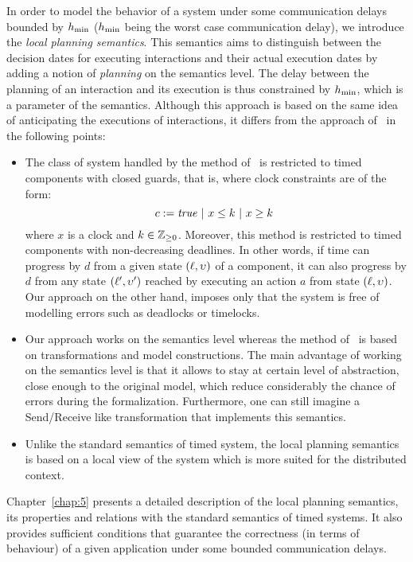 In order to model the behavior of a system under some communication delays bounded by $h_{\min}$
($h_{\min}$ being the worst case communication delay), we introduce the \emph{local planning 
semantics}. This semantics aims to distinguish between the decision dates for executing 
interactions and their actual execution dates by adding a notion of \emph{planning} on 
the semantics level. The delay between the planning of an interaction and its execution is
thus constrained by $h_{\min}$, which is a parameter of the semantics. Although this approach 
is based on the same idea of anticipating the executions of interactions, it differs from 
the approach of~\cite{ahlem_these} in the following points:
\begin{itemize}
  \item The class of system handled by the method of~\cite{ahlem_these} is restricted to 
    timed components with closed guards, that is, where clock constraints are of the form:
    \begin{displaymath}
    c:=\textnormal{\textit{true}} \ | \ x\le k \ |\ x\ge k \
    \end{displaymath}
    where $x$ is a clock and $k\in\mathbb{Z}_{\ge 0}$.
    Moreover, this method is restricted to timed components with non-decreasing deadlines. In
    other words, if time can progress by $d$ from a given state $(\ell,\upsilon)$ of a component, 
    it can also progress by $d$ from any state $(\ell',\upsilon')$ reached by executing an action
    $a$ from state $(\ell,\upsilon)$. Our approach on the other hand, imposes only that 
    the system is free of modelling errors such as deadlocks or timelocks. 
  \item Our approach works on the semantics level whereas the method of~\cite{ahlem_these} 
    is based on 
    transformations and model constructions. The main advantage of working on the semantics
    level is that it allows to stay at certain level of abstraction, close enough to the 
    original model, which reduce considerably the chance of errors during the formalization.
    Furthermore, one can still imagine a Send/Receive like transformation that implements
    this semantics.
  \item Unlike the standard semantics of timed system, 
    the local planning semantics is based on a local view of the system which is more suited
    for the distributed context.  
\end{itemize}
Chapter~\ref{chap:5} presents a detailed description of the local planning semantics, its 
properties and relations with the standard semantics of timed systems. It also provides
sufficient conditions that guarantee the correctness (in terms of behaviour) of a given
application under some bounded communication delays.

